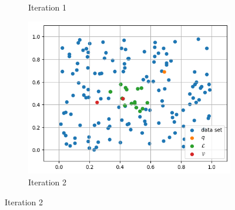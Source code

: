 \begin{figure}[ht]
\begin{subfigure}{0.31\textwidth}
        \caption{Iteration 1}
    \end{subfigure}
    \hfill
    \begin{subfigure}{0.31\textwidth}
        \includegraphics[width=\textwidth]{images/greedy-search-2}
        \caption{Iteration 2}
    \end{subfigure}
    \hfill


\end{figure}
